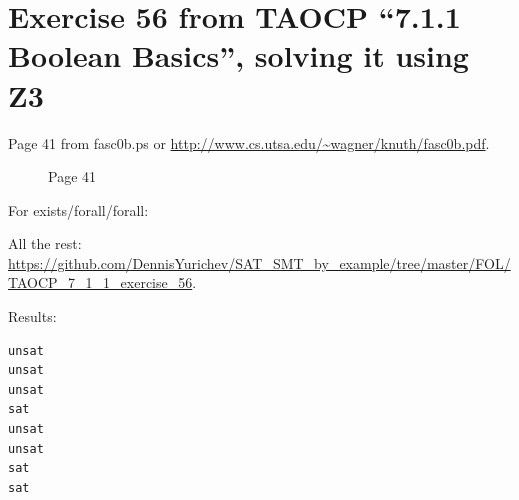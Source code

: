 \section{Exercise 56 from TAOCP ``7.1.1 Boolean Basics'', solving it using Z3}

Page 41 from fasc0b.ps or \url{http://www.cs.utsa.edu/~wagner/knuth/fasc0b.pdf}.

\begin{figure}[H]
\centering
{}
\caption{Page 41}
\end{figure}

For exists/forall/forall:



All the rest: \url{https://github.com/DennisYurichev/SAT_SMT_by_example/tree/master/FOL/TAOCP_7_1_1_exercise_56}.

Results:



\begin{lstlisting}
unsat
unsat
unsat
sat
unsat
unsat
sat
sat
\end{lstlisting}

